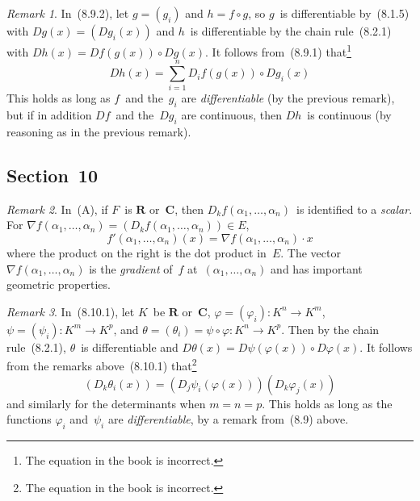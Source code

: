 \documentclass[letterpaper,12pt]{article}
\newcommand{\R}{\mathbf{R}}
\newcommand{\C}{\mathbf{C}}
\newcommand{\after}{\circ}
\newcommand{\grad}{\nabla}
\theoremstyle{plain}
\theoremstyle{definition}
\theoremstyle{remark}
\newtheorem*{rmk}{Remark}
\begin{document}
\begin{rmk}
In~(8.9.2), let \(g=(g_i)\) and \(h=f\after g\), so \(g\)~is differentiable by~(8.1.5) with \(Dg(x)=(Dg_i(x))\) and \(h\)~is differentiable by the chain rule~(8.2.1) with \(Dh(x)=Df(g(x))\after Dg(x)\). It follows from~(8.9.1) that\footnote{The equation in the book is incorrect.}
\[Dh(x)=\sum_{i=1}^nD_if(g(x))\after Dg_i(x)\]
This holds as long as \(f\)~and the~\(g_i\) are \emph{differentiable} (by the previous remark), but if in addition \(Df\)~and the~\(Dg_i\) are continuous, then \(Dh\)~is continuous (by reasoning as in the previous remark).
\end{rmk}

\subsection*{Section~10}
\begin{rmk}
In~(A), if \(F\)~is \(\R\) or~\(\C\), then \(D_kf(\alpha_1,\ldots,\alpha_n)\)~is identified to a \emph{scalar}. For \(\grad f(\alpha_1,\ldots,\alpha_n)=(D_kf(\alpha_1,\ldots,\alpha_n))\in E\),
\[f'(\alpha_1,\ldots,\alpha_n)(x)=\grad f(\alpha_1,\ldots,\alpha_n)\cdot x\]
where the product on the right is the dot product in~\(E\). The vector \(\grad f(\alpha_1,\ldots,\alpha_n)\) is the \emph{gradient} of~\(f\) at~\((\alpha_1,\ldots,\alpha_n)\) and has important geometric properties.
\end{rmk}

\begin{rmk}
In~(8.10.1), let \(K\)~be \(\R\) or~\(\C\), \(\varphi=(\varphi_i):K^n\to K^m\), \(\psi=(\psi_i):K^m\to K^p\), and \(\theta=(\theta_i)=\psi\after\varphi:K^n\to K^p\). Then by the chain rule~(8.2.1), \(\theta\)~is differentiable and \(D\theta(x)=D\psi(\varphi(x))\after D\varphi(x)\). It follows from the remarks above~(8.10.1) that\footnote{The equation in the book is incorrect.}
\[(D_k\theta_i(x))=(D_j\psi_i(\varphi(x)))(D_k\varphi_j(x))\]
and similarly for the determinants when \(m=n=p\). This holds as long as the functions \(\varphi_i\) and~\(\psi_i\) are \emph{differentiable}, by a remark from~(8.9) above.
\end{rmk}
\end{document}
